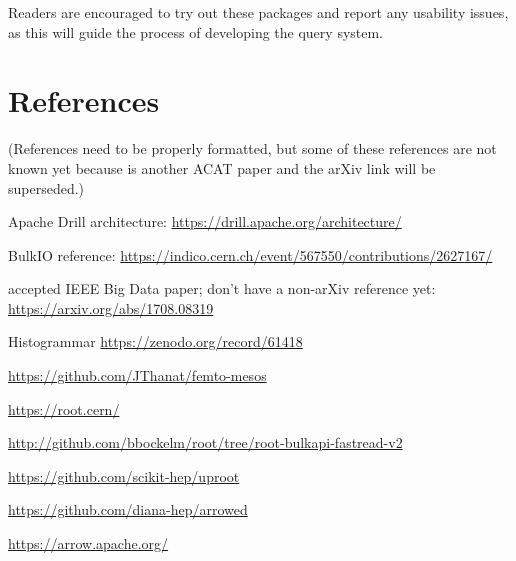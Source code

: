 \documentclass[a4paper]{jpconf}
\begin{document}
Readers are encouraged to try out these packages and report any usability issues, as this will guide the process of developing the query system.

\section*{References}
(References need to be properly formatted, but some of these references are not known yet because \cite{bulkio} is another ACAT paper and the arXiv link \cite{ieee} will be superseded.)

\begin{thebibliography}{9}

 Apache Drill architecture: \url{https://drill.apache.org/architecture/}

 BulkIO reference: \url{https://indico.cern.ch/event/567550/contributions/2627167/}

 accepted IEEE Big Data paper; don't have a non-arXiv reference yet: \url{https://arxiv.org/abs/1708.08319}

 Histogrammar \url{https://zenodo.org/record/61418}

 \url{https://github.com/JThanat/femto-mesos}

 \url{https://root.cern/}

 \url{http://github.com/bbockelm/root/tree/root-bulkapi-fastread-v2}

 \url{https://github.com/scikit-hep/uproot}

 \url{https://github.com/diana-hep/arrowed}

 \url{https://arrow.apache.org/}

\end{thebibliography}
\end{document}
